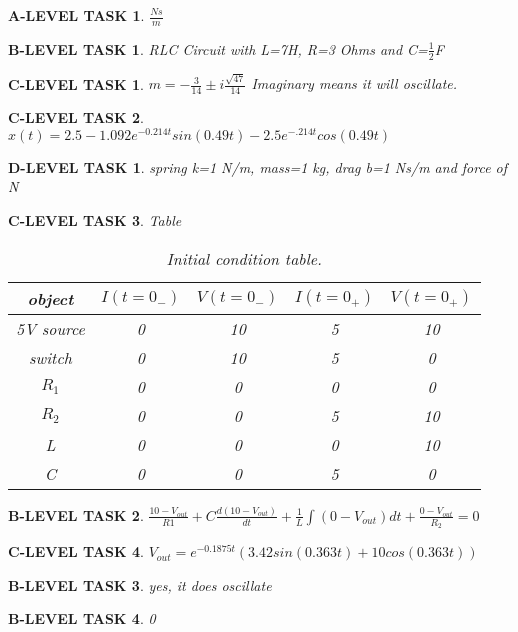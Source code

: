 \documentclass{book}
\numberwithin{equation}{section}
\newtheorem{alevel}{A-LEVEL TASK}
\newtheorem{blevel}{B-LEVEL TASK}
\newtheorem{clevel}{C-LEVEL TASK}
\newtheorem{dlevel}{D-LEVEL TASK}
\theoremstyle{definition}
\begin{document}
\begin{alevel}$\frac{Ns}{m}$\end{alevel}
\begin{blevel}RLC Circuit with L=7H, R=3 Ohms and C=$\frac{1}{2}$F\end{blevel}
\begin{clevel}$m=-\frac{3}{14} \pm i\frac{\sqrt{47}}{14}$ Imaginary means it will oscillate.\end{clevel}
\begin{clevel}$x(t)=2.5-1.092e^{-0.214t}sin(0.49 t)-2.5e^{-.214t}cos(0.49 t)$\end{clevel}
\begin{dlevel}spring k=1 N/m, mass=1 kg, drag b=1 Ns/m and force of N\end{dlevel}

\begin{clevel} Table\par
\begin{table}[H]
\begin{center}
\begin{tabular}{|c|c|c|c|c|} \hline
object	&$I(t=0_{-})$	&$V(t=0_{-})$	&$I(t=0_{+})$	&$V(t=0_{+})$ \\ \hline
5V source&0&10&5&10 \\ \hline
switch&0&10&5&0 \\ \hline
$R_1$&0&0&0&0 \\ \hline
$R_2$&0&0&5&10 \\ \hline
L&0&0&0&10 \\ \hline
C&0&0&5&0 \\ \hline
\end{tabular}
\caption{Initial condition table.}
\label{T:ic2}
\end{center}
\end{table}
\end{clevel}

\begin{blevel}$\frac{10-V_{out}}{R1}+C\frac{d(10-V_{out})}{dt}+\frac{1}{L}\int{(0-V_{out})dt}+\frac{0-V_{out}}{R_2}=0$\end{blevel}
\begin{clevel}$V_{out}=e^{-0.1875t}(3.42sin(0.363 t)+10cos(0.363 t))$\end{clevel}
\begin{blevel}yes, it does oscillate\end{blevel}
\begin{blevel}0\end{blevel}

\end{document}
